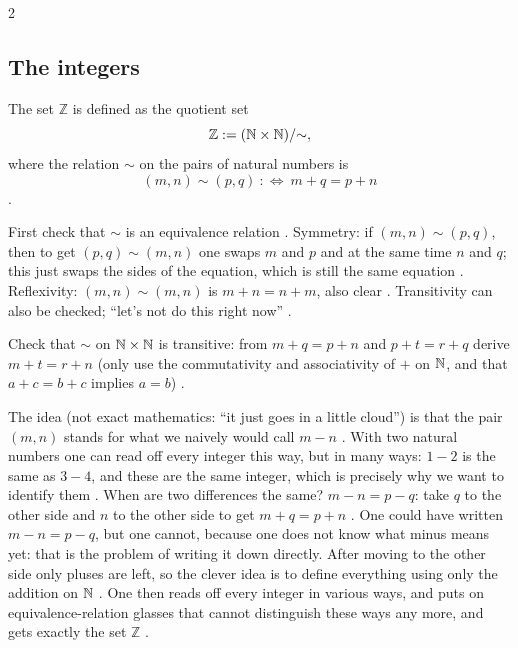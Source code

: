 \begin{paracol}{2}
\subsection*{The integers}

\begin{definition}\label{def:cl-Z}
The set $\mathbb Z$ is defined as the quotient set
\[
  \mathbb Z:=(\mathbb{N}\times\mathbb{N})/{\sim},
\]
where the relation $\sim$ on the pairs of natural numbers is
\[
  (m,n)\sim(p,q)\ :\Longleftrightarrow\ m+q=p+n
\]
.
\end{definition}

First check that $\sim$ is an equivalence relation . Symmetry: if $(m,n)\sim(p,q)$, then to get
$(p,q)\sim(m,n)$ one swaps $m$ and $p$ and at the same time $n$ and $q$; this just swaps the sides of the equation, which is
still the same equation . Reflexivity: $(m,n)\sim(m,n)$ is $m+n=n+m$, also clear
. Transitivity can also be checked; ``let's not do this right now''
.

\begin{exercise}[Transitivity]\label{ex:cl-transitivity}
Check that $\sim$ on $\mathbb{N}\times\mathbb{N}$ is transitive: from $m+q=p+n$ and $p+t=r+q$ derive $m+t=r+n$ (only use the commutativity and
associativity of $+$ on $\mathbb{N}$, and that $a+c=b+c$ implies $a=b$) .
\end{exercise}

\begin{intuition}\label{int:cl-diff}
The idea (not exact mathematics: ``it just goes in a little cloud'') is that the pair $(m,n)$ stands for what we naively
would call $m-n$ . With two natural numbers one can read off every integer
this way, but in many ways: $1-2$ is the same as $3-4$, and these are the same integer, which is precisely why we want to
identify them . When are two differences the same? $m-n=p-q$: take $q$ to the other side and
$n$ to the other side to get $m+q=p+n$ . One could have written $m-n=p-q$, but one cannot,
because one does not know what minus means yet: that is the problem of writing it down directly. After moving to the other
side only pluses are left, so the clever idea is to define everything using only the addition on $\mathbb{N}$
. One then reads off every integer in various ways, and puts on equivalence-relation glasses
that cannot distinguish these ways any more, and gets exactly the set $\mathbb Z$ .
\end{intuition}


\end{paracol}
